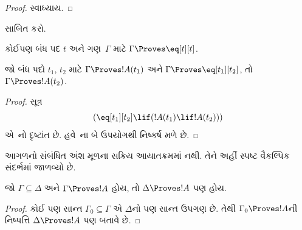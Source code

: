 \begin{proof}
સ્વાધ્યાય.
\end{proof}

\begin{prob}
 સાબિત કરો.
\end{prob}

\begin{prop}
 કોઈપણ બંધ પદ $t$ અને ગણ~$\Gamma$ માટે $\Gamma \Proves \eq[t][t]$.
\end{prop}

\begin{prop}
  જો બંધ પદો $t_1$, $t_2$ માટે $\Gamma \Proves !A(t_1)$ અને
  $\Gamma \Proves \eq[t_1][t_2]$, તો $\Gamma \Proves !A(t_2)$.
\end{prop}


\begin{proof}
સૂત્ર
\[
(\eq[t_1][t_2] \lif (!A(t_1) \lif !A(t_2)))
\]
એ~નો દૃષ્ટાંત છે. હવે~\MP{}ના બે ઉપયોગથી નિષ્કર્ષ મળે છે.
\end{proof}
\endgroup


\OLEndChapterHook


\begin{editorial}
આગળનો સંબંધિત અંશ મૂળના સક્રિય આયાતક્રમમાં નથી. તેને અહીં સ્પષ્ટ વૈકલ્પિક સંદર્ભમાં જાળવ્યો છે.
\end{editorial}
\begingroup
\makeatletter{}\makeatother


\label{guunit:OLP-0643}


\begin{prop} જો $\Gamma \subseteq \Delta$ અને $\Gamma \Proves !A$
હોય, તો $\Delta \Proves !A$ પણ હોય. \end{prop}

\begin{proof} કોઈ પણ સાન્ત $\Gamma_0 \subseteq \Gamma$ એ
$\Delta$નો પણ સાન્ત ઉપગણ છે. તેથી
$\Gamma_0 \Proves !A$ની નિષ્પત્તિ
$\Delta \Proves !A$ પણ બતાવે છે. \end{proof}


